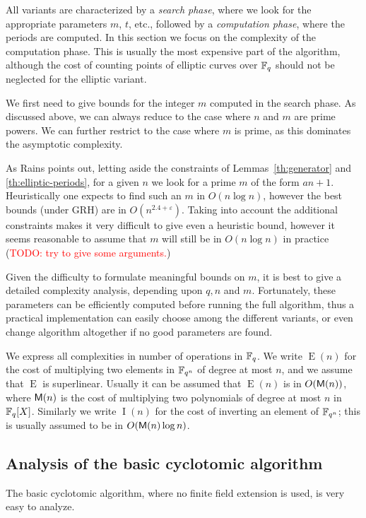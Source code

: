 \documentclass{article}
\newcommand{\todo}[1]{(\textcolor{red}{TODO: #1})}
\DeclareMathOperator{\Ext}{E}
\DeclareMathOperator{\Inv}{I}
\begin{document}
All variants are characterized by a \emph{search phase}, where we look
for the appropriate parameters $m$, $t$, etc., followed by a
\emph{computation phase}, where the periods are computed. In this
section we focus on the complexity of the computation phase. This is
usually the most expensive part of the algorithm, although the cost of
counting points of elliptic curves over $\mathbb{F}_q$ should not be neglected
for the elliptic variant.

We first need to give bounds for the integer $m$ computed in the
search phase. As discussed above, we can always reduce to the case
where $n$ and $m$ are prime powers. We can further restrict to the
case where $m$ is prime, as this dominates the asymptotic complexity.

As Rains points out, letting aside the constraints of
Lemmas~\ref{th:generator} and \ref{th:elliptic-periods}, for a given
$n$ we look for a prime $m$ of the form $an+1$. Heuristically one
expects to find such an $m$ in $O(n\log n)$, however the best bounds
(under GRH) are in $O(n^{2.4+\varepsilon})$. Taking into account the
additional constraints makes it very difficult to give even a
heuristic bound, however it seems reasonable to assume that $m$ will
still be in $O(n\log n)$ in practice \todo{try to give some
  arguments.}

Given the difficulty to formulate meaningful bounds on $m$, it is best
to give a detailed complexity analysis, depending upon $q,n$ and
$m$. Fortunately, these parameters can be efficiently computed before
running the full algorithm, thus a practical implementation can easily
choose among the different variants, or even change algorithm
altogether if no good parameters are found.

We express all complexities in number of operations in $\mathbb{F}_q$. We
write $\Ext(n)$ for the cost of multiplying two elements in $\mathbb{F}_{q^n}$
of degree at most $n$, and we assume that $\Ext$ is
superlinear. Usually it can be assumed that $\Ext(n)$ is in
$O(\mathsf{M}(n))$, where $\mathsf{M}(n)$ is the cost of multiplying two
polynomials of degree at most $n$ in $\mathbb{F}_q[X]$. Similarly we write
$\Inv(n)$ for the cost of inverting an element of $\mathbb{F}_{q^n}$; this is
usually assumed to be in $O(\mathsf{M}(n)\log n)$.

\subsection{Analysis of the basic cyclotomic algorithm}

The basic cyclotomic algorithm, where no finite field extension is
used, is very easy to analyze.
\end{document}
